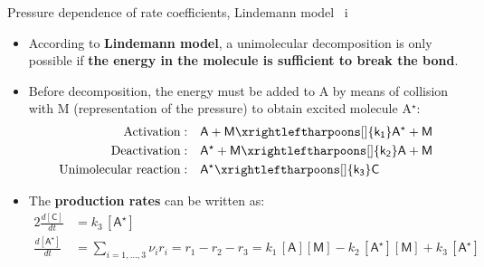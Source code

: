 %
\begin{frame}{Pressure dependence of rate coefficients, Lindemann model \, i}
	\begin{itemize}
		\item According to \alert{\bf Lindemann model}, a unimolecular decomposition is only possible if {\bf the energy in the molecule is 
		sufficient to break the bond}.
		\item Before decomposition, the energy must be added to A by means of collision with M (representation of the pressure) to obtain excited molecule A$^\star$:
		 \begin{alignat*}{2}
			\mbox{Activation} : & \quad \mathsf{A + M \xrightleftharpoons[]{k_1} A^\star + M} \\
			\mbox{Deactivation}: & \quad \mathsf{A^\star + M \xrightleftharpoons[]{k_2} A + M} \\
			\mbox{Unimolecular reaction}: & \quad \mathsf{A^\star \xrightleftharpoons[]{k_3} C}
		 \end{alignat*}
		\item The {\bf production rates} can be written as: 
		 \begin{alignat*}{2}
			\tfrac{d\mathsf{[C]}}{dt}          & = k_3 \, \mathsf{[A^\star]} \\
			\tfrac{d\mathsf{[A^\star]}}{dt} & 
			= \sum_{i = 1, \ldots, 3} \nu_i r_i 
			=  r_1 - r_2 - r_3 
			= k_1 \, \mathsf{[A][M]} - k_2 \, \mathsf{[A^\star][M]} + k_3 \, \mathsf{[A^\star]}
		\end{alignat*}
	\end{itemize}
\end{frame}
%
%
